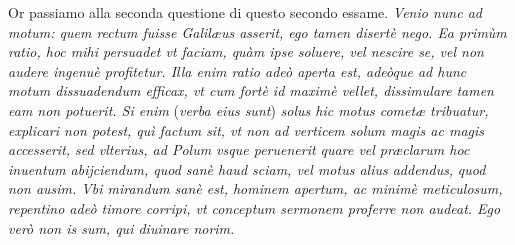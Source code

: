 \documentclass[11pt,twoside,openany]{book}
\begin{document}
\par\bigskip\noindent{}\enspace Or passiamo alla seconda questione di questo secondo essame. \textit{Venio nunc ad motum: quem rectum fuisse Galilæus asserit, ego tamen disertè nego. Ea primùm ratio, hoc mihi persuadet vt faciam, quàm ipse soluere, vel nescire se, vel non audere ingenuè profitetur. Illa enim ratio adeò aperta est, adeòque ad hunc motum dissuadendum efficax, vt cum fortè id maximè vellet, dissimulare}\textit{ tamen eam non potuerit. Si enim }(\textit{verba eius sunt})\textit{ solus hic motus cometæ tribuatur, explicari non potest, quì factum sit, vt non ad verticem solum magis ac magis accesserit, sed vlterius, ad Polum vsque peruenerit quare vel præclarum hoc inuentum abijciendum, quod sanè haud sciam, vel motus alius addendus,}\textit{ }\textit{quod non ausim. Vbi mirandum sanè est, hominem apertum, ac minimè meticulosum, repentino adeò timore corripi, vt conceptum sermonem proferre non audeat. Ego verò non is sum, qui diuinare norim.}
\end{document}
